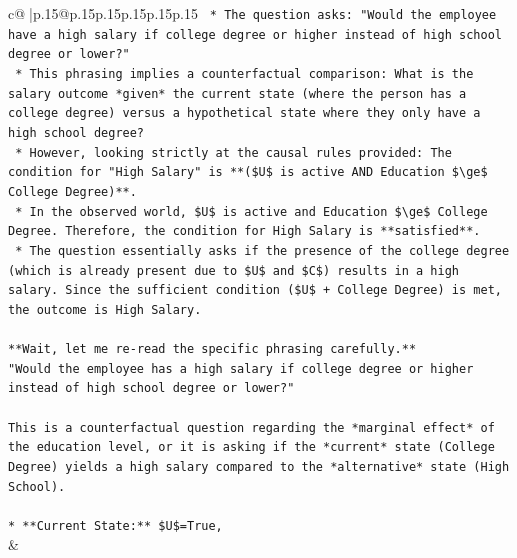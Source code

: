 \documentclass{article}
\begin{document}
{\begin{supertabular}{c@{$\;$}|p{.15\linewidth}@{}p{.15\linewidth}p{.15\linewidth}p{.15\linewidth}p{.15\linewidth}p{.15\linewidth}}
{{{\texttt{    *   The question asks: "Would the employee have a high salary if college degree or higher instead of high school degree or lower?"} \\
\texttt{    *   This phrasing implies a counterfactual comparison: What is the salary outcome *given* the current state (where the person has a college degree) versus a hypothetical state where they only have a high school degree?} \\
\texttt{    *   However, looking strictly at the causal rules provided: The condition for "High Salary" is **(\$U\$ is active AND Education \$\textbackslash{}ge\$ College Degree)**.} \\
\texttt{    *   In the observed world, \$U\$ is active and Education \$\textbackslash{}ge\$ College Degree. Therefore, the condition for High Salary is **satisfied**.} \\
\texttt{    *   The question essentially asks if the presence of the college degree (which is already present due to \$U\$ and \$C\$) results in a high salary. Since the sufficient condition (\$U\$ + College Degree) is met, the outcome is High Salary.} \\
\\ 
\texttt{**Wait, let me re{-}read the specific phrasing carefully.**} \\
\texttt{"Would the employee has a high salary if college degree or higher instead of high school degree or lower?"} \\
\\ 
\texttt{This is a counterfactual question regarding the *marginal effect* of the education level, or it is asking if the *current* state (College Degree) yields a high salary compared to the *alternative* state (High School).} \\
\\ 
\texttt{*   **Current State:** \$U\$=True,} \\
            }
        }
    }
    & \\ \\


\end{supertabular}}
\end{document}
